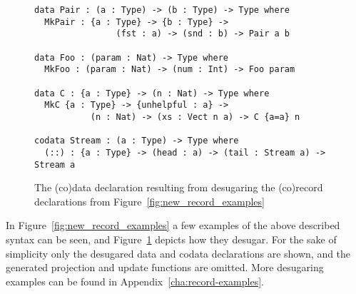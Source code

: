 \begin{figure}[h]
\begin{lstlisting}
data Pair : (a : Type) -> (b : Type) -> Type where
  MkPair : {a : Type} -> {b : Type} -> 
                (fst : a) -> (snd : b) -> Pair a b

data Foo : (param : Nat) -> Type where
  MkFoo : (param : Nat) -> (num : Int) -> Foo param

data C : {a : Type} -> (n : Nat) -> Type where
  MkC {a : Type} -> {unhelpful : a} -> 
           (n : Nat) -> (xs : Vect n a) -> C {a=a} n

codata Stream : (a : Type) -> Type where
  (::) : {a : Type} -> (head : a) -> (tail : Stream a) -> Stream a
\end{lstlisting}
  \caption{The (co)data declaration resulting from desugaring the (co)record
    declarations from Figure~\ref{fig:new_record_examples}}
  \label{fig:new_record_examples_desugared}
\end{figure}

In Figure~\ref{fig:new_record_examples} a few examples of the above described
syntax can be seen, and Figure~\ref{fig:new_record_examples_desugared} depicts how
they desugar. For the sake of simplicity only the desugared data and codata
declarations are shown, and the generated projection and update functions are omitted. More desugaring examples can be found in
Appendix~\ref{cha:record-examples}.

